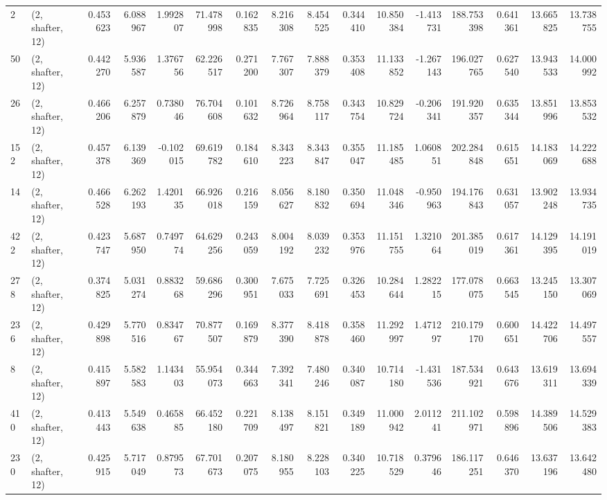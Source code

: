 \begin{tabular}{llrrrrrrrrrrrrrr}
2   &  (2, shafter, 12) &   0.453623 &   6.088967 &   1.992807 &    71.478998 &   0.162835 &   8.216308 &   8.454525 &  0.344410 &  10.850384 &  -1.413731 &   188.753398 &   0.641361 &  13.665825 &  13.738755 \\
50  &  (2, shafter, 12) &   0.442270 &   5.936587 &   1.376756 &    62.226517 &   0.271200 &   7.767307 &   7.888379 &  0.353408 &  11.133852 &  -1.267143 &   196.027765 &   0.627540 &  13.943533 &  14.000992 \\
26  &  (2, shafter, 12) &   0.466206 &   6.257879 &   0.738046 &    76.704608 &   0.101632 &   8.726964 &   8.758117 &  0.343754 &  10.829724 &  -0.206341 &   191.920357 &   0.635344 &  13.851996 &  13.853532 \\
152 &  (2, shafter, 12) &   0.457378 &   6.139369 &  -0.102015 &    69.619782 &   0.184610 &   8.343223 &   8.343847 &  0.355047 &  11.185485 &   1.060851 &   202.284848 &   0.615651 &  14.183069 &  14.222688 \\
14  &  (2, shafter, 12) &   0.466528 &   6.262193 &   1.420135 &    66.926018 &   0.216159 &   8.056627 &   8.180832 &  0.350694 &  11.048346 &  -0.950963 &   194.176843 &   0.631057 &  13.902248 &  13.934735 \\
422 &  (2, shafter, 12) &   0.423747 &   5.687950 &   0.749774 &    64.629256 &   0.243059 &   8.004192 &   8.039232 &  0.353976 &  11.151755 &   1.321064 &   201.385019 &   0.617361 &  14.129395 &  14.191019 \\
278 &  (2, shafter, 12) &   0.374825 &   5.031274 &   0.883268 &    59.686296 &   0.300951 &   7.675033 &   7.725691 &  0.326453 &  10.284644 &   1.282215 &   177.078075 &   0.663545 &  13.245150 &  13.307069 \\
236 &  (2, shafter, 12) &   0.429898 &   5.770516 &   0.834767 &    70.877507 &   0.169879 &   8.377390 &   8.418878 &  0.358460 &  11.292997 &   1.471297 &   210.179170 &   0.600651 &  14.422706 &  14.497557 \\
8   &  (2, shafter, 12) &   0.415897 &   5.582583 &   1.143403 &    55.954073 &   0.344663 &   7.392341 &   7.480246 &  0.340087 &  10.714180 &  -1.431536 &   187.534921 &   0.643676 &  13.619311 &  13.694339 \\
410 &  (2, shafter, 12) &   0.413443 &   5.549638 &   0.465885 &    66.452180 &   0.221709 &   8.138497 &   8.151821 &  0.349189 &  11.000942 &   2.011241 &   211.102971 &   0.598896 &  14.389506 &  14.529383 \\
230 &  (2, shafter, 12) &   0.425915 &   5.717049 &   0.879573 &    67.701673 &   0.207075 &   8.180955 &   8.228103 &  0.340225 &  10.718529 &   0.379646 &   186.117251 &   0.646370 &  13.637196 &  13.642480 \\

\end{tabular}
